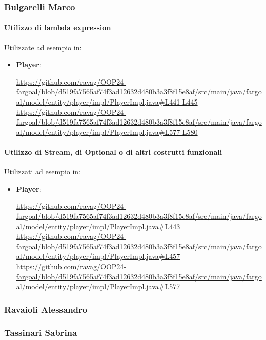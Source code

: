 \documentclass{report}
\begin{document}
\subsubsection{Bulgarelli Marco}

\paragraph{Utilizzo di lambda expression}Utilizzate ad esempio in:
\begin{itemize}
    \item \textbf{Player}: 
        \begin{sloppypar}
        \url{https://github.com/ravag/OOP24-fargoal/blob/d519fa7565af74f3ad12632d480b3a3f8f15e8af/src/main/java/fargoal/model/entity/player/impl/PlayerImpl.java#L441-L445}
        \url{https://github.com/ravag/OOP24-fargoal/blob/d519fa7565af74f3ad12632d480b3a3f8f15e8af/src/main/java/fargoal/model/entity/player/impl/PlayerImpl.java#L577-L580}
        \end{sloppypar}
\end{itemize}

\paragraph{Utilizzo di Stream, di Optional o di altri costrutti funzionali}Utilizzati ad esempio in:
\begin{itemize}
    \item \textbf{Player}:
        \begin{sloppypar}
            \url{https://github.com/ravag/OOP24-fargoal/blob/d519fa7565af74f3ad12632d480b3a3f8f15e8af/src/main/java/fargoal/model/entity/player/impl/PlayerImpl.java#L443}
            \url{https://github.com/ravag/OOP24-fargoal/blob/d519fa7565af74f3ad12632d480b3a3f8f15e8af/src/main/java/fargoal/model/entity/player/impl/PlayerImpl.java#L457}
            \url{https://github.com/ravag/OOP24-fargoal/blob/d519fa7565af74f3ad12632d480b3a3f8f15e8af/src/main/java/fargoal/model/entity/player/impl/PlayerImpl.java#L577}
        \end{sloppypar}
\end{itemize}

\subsubsection{Ravaioli Alessandro}

\subsubsection{Tassinari Sabrina}
\end{document}
